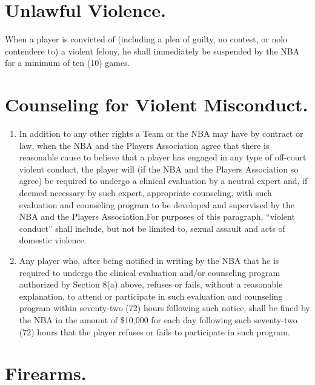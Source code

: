 \documentclass[
]{book}
\providecommand{\tightlist}{%
  \setlength{\itemsep}{0pt}\setlength{\parskip}{0pt}}
\begin{document}
\hypertarget{unlawful-violence.}{%
\section{Unlawful Violence.}\label{unlawful-violence.}}

When a player is convicted of (including a plea of guilty, no contest, or nolo contendere to) a violent felony, he shall immediately be suspended by the NBA for a minimum of ten (10) games.

\hypertarget{counseling-for-violent-misconduct.}{%
\section{Counseling for Violent Misconduct.}\label{counseling-for-violent-misconduct.}}

\begin{enumerate}
\def\labelenumi{(\alph{enumi})}
\tightlist
\item
  In addition to any other rights a Team or the NBA may have by contract or law, when the NBA and the Players Association agree that there is reasonable cause to believe that a player has engaged in any type of off-court violent conduct, the player will (if the NBA and the Players Association so agree) be required to undergo a clinical evaluation by a neutral expert and, if deemed necessary by such expert, appropriate counseling, with such evaluation and counseling program to be developed and supervised by the NBA and the Players Association.For purposes of this paragraph, ``violent conduct'' shall include, but not be limited to, sexual assault and acts of domestic violence.
\item
  Any player who, after being notified in writing by the NBA that he is required to undergo the clinical evaluation and/or counseling program authorized by Section 8(a) above, refuses or fails, without a reasonable explanation, to attend or participate in such evaluation and counseling program within seventy-two (72) hours following such notice, shall be fined by the NBA in the amount of \$10,000 for each day following such seventy-two (72) hours that the player refuses or fails to participate in such program.
\end{enumerate}

\hypertarget{firearms.}{%
\section{Firearms.}\label{firearms.}}
\end{document}
